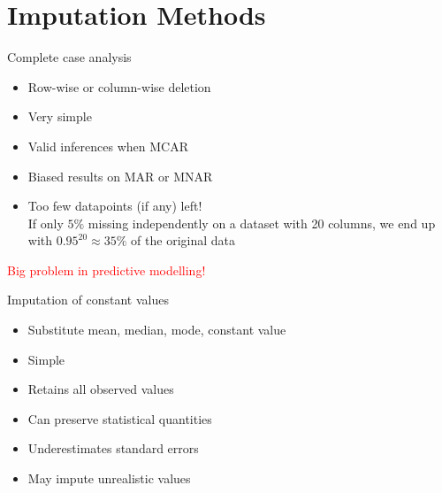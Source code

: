 \documentclass[aspectratio=43]{beamer}
\newcommand\pro{\item[$+$]}
\newcommand\con{\item[$-$]}
\begin{document}
\section{Imputation Methods}

\begin{frame}{Complete case analysis}
\begin{itemize}
\item Row-wise or column-wise deletion
\end{itemize}
\begin{itemize}
\pro Very simple
\pro Valid inferences when MCAR
\end{itemize}
\begin{itemize}
\con Biased results on MAR or MNAR
\con Too few datapoints (if any) left!\\
If only $5\%$ missing independently on a dataset with 20 columns, we end up with $0.95^{20} \approx 35\%$ of the original data\\
\end{itemize}
\textcolor{red}{Big problem in predictive modelling!}
\end{frame}

\begin{frame}{Imputation of constant values}
\begin{itemize}
\item Substitute mean, median, mode, constant value
\end{itemize}
\begin{itemize}
\pro Simple
\pro Retains all observed values
\pro Can preserve statistical quantities
\end{itemize}
\begin{itemize}
\con Underestimates standard errors
\con May impute unrealistic values
\end{itemize}
\end{frame}
\end{document}
